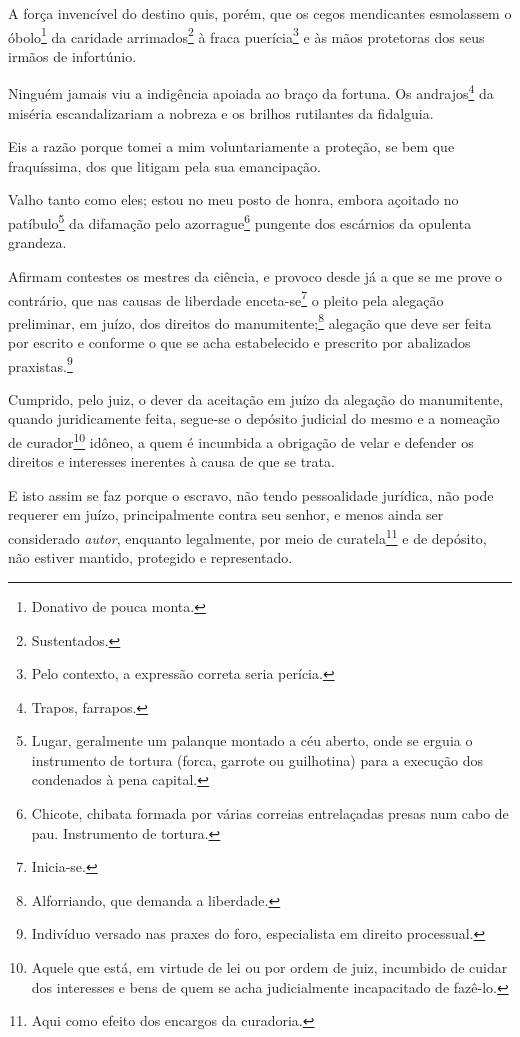 A força invencível do destino quis, porém, que os cegos mendicantes
esmolassem o óbolo\footnote{Donativo de pouca monta.} da caridade
arrimados\footnote{Sustentados.} à fraca puerícia\footnote{Pelo
  contexto, a expressão correta seria perícia.} e às mãos protetoras dos
seus irmãos de infortúnio.

Ninguém jamais viu a indigência apoiada ao braço da fortuna. Os
andrajos\footnote{Trapos, farrapos.} da miséria escandalizariam a
nobreza e os brilhos rutilantes da fidalguia.

Eis a razão porque tomei a mim voluntariamente a proteção, se bem que
fraquíssima, dos que litigam pela sua emancipação.

Valho tanto como eles; estou no meu posto de honra, embora açoitado no
patíbulo\footnote{Lugar, geralmente um palanque montado a céu aberto,
  onde se erguia o instrumento de tortura (forca, garrote ou guilhotina)
  para a execução dos condenados à pena capital.} da difamação pelo
azorrague\footnote{Chicote, chibata formada por várias correias
  entrelaçadas presas num cabo de pau. Instrumento de tortura.} pungente
dos escárnios da opulenta grandeza.



Afirmam contestes os mestres da ciência, e provoco desde já a que se me
prove o contrário, que nas causas de liberdade enceta-se\footnote{
  Inicia-se.} o pleito pela alegação preliminar, em juízo, dos direitos
do manumitente;\footnote{Alforriando, que demanda a liberdade.}
alegação que deve ser feita por escrito e conforme o que se acha
estabelecido e prescrito por abalizados praxistas.\footnote{Indivíduo
  versado nas praxes do foro, especialista em direito processual.}

Cumprido, pelo juiz, o dever da aceitação em juízo da alegação do
manumitente, quando juridicamente feita, segue-se o depósito judicial do
mesmo e a nomeação de curador\footnote{Aquele que está, em virtude de
  lei ou por ordem de juiz, incumbido de cuidar dos interesses e bens de
  quem se acha judicialmente incapacitado de fazê-lo.} idôneo, a quem é
incumbida a obrigação de velar e defender os direitos e interesses
inerentes à causa de que se trata.

E isto assim se faz porque o escravo, não tendo pessoalidade jurídica,
não pode requerer em juízo, principalmente contra seu senhor, e menos
ainda ser considerado \emph{autor}, enquanto legalmente, por meio de
curatela\footnote{Aqui como efeito dos encargos da curadoria.} e de
depósito, não estiver mantido, protegido e representado.

